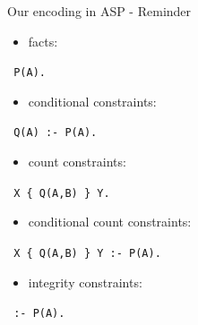 \documentclass[10pt,dvipsnames]{beamer}
\begin{document}
\begin{frame}{Our encoding in ASP - Reminder}
  \begin{itemize}
  \item facts:
 \end{itemize}
 \begin{center}
  \texttt{ P(A). }
 \end{center}
 
 \vspace{0.5cm} 
   \begin{itemize}
  \item conditional constraints:
 \end{itemize}
 \begin{center}
  \texttt{ Q(A) :- P(A). }
 \end{center}

  \vspace{0.5cm} 
  \begin{itemize}
  \item count constraints:
 \end{itemize}
 \begin{center}
  \texttt{ X \{ Q(A,B) \} Y. }
 \end{center}

 \vspace{0.5cm} 
 \begin{itemize}
  \item conditional count constraints:
 \end{itemize}
 \begin{center}
  \texttt{ X \{ Q(A,B) \} Y :- P(A). }
 \end{center}

  \vspace{0.5cm} 
  \begin{itemize}
  \item integrity constraints:
 \end{itemize}
  \begin{center}
  \texttt{ :- P(A). }
 \end{center}
\end{frame}
\end{document}
